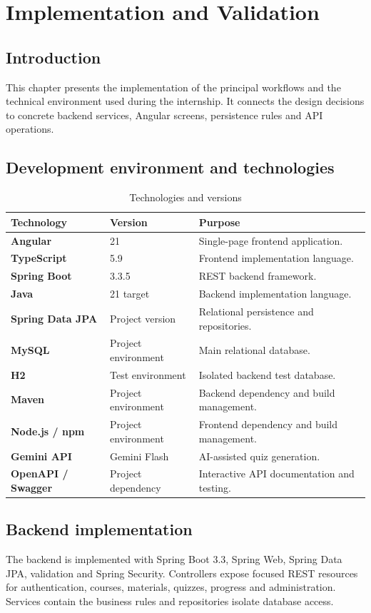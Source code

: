 \chapter{Implementation and Validation}
\section*{Introduction}
This chapter presents the implementation of the principal workflows and the
technical environment used during the internship. It connects the design
decisions to concrete backend services, Angular screens, persistence rules and
API operations.

\section{Development environment and technologies}
\begin{table}[H]\centering
\caption{Technologies and versions}\label{tab:technologies}
\begin{tabularx}{\textwidth}{>{\bfseries}p{}p{}X}
\toprule Technology & Version & Purpose\\\midrule
Angular & 21 & Single-page frontend application.\\
TypeScript & 5.9 & Frontend implementation language.\\
Spring Boot & 3.3.5 & REST backend framework.\\
Java & 21 target & Backend implementation language.\\
Spring Data JPA & Project version & Relational persistence and repositories.\\
MySQL & Project environment & Main relational database.\\
H2 & Test environment & Isolated backend test database.\\
Maven & Project environment & Backend dependency and build management.\\
Node.js / npm & Project environment & Frontend dependency and build management.\\
Gemini API & Gemini Flash & AI-assisted quiz generation.\\
OpenAPI / Swagger & Project dependency & Interactive API documentation and testing.\\
\bottomrule
\end{tabularx}
\end{table}

\section{Backend implementation}
The backend is implemented with Spring Boot 3.3, Spring Web, Spring Data JPA,
validation and Spring Security. Controllers expose focused REST resources for
authentication, courses, materials, quizzes, progress and administration.
Services contain the business rules and repositories isolate database access.




